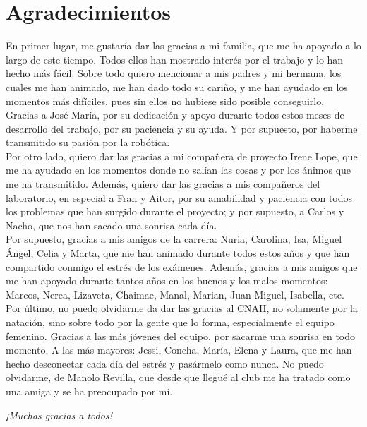 \chapter*{Agradecimientos}
En primer lugar, me gustaría dar las gracias a mi familia, que me ha apoyado a lo largo de este tiempo. Todos ellos han mostrado interés por el trabajo y lo han hecho más fácil. Sobre todo quiero mencionar a mis padres y mi hermana, los cuales me han animado, me han dado todo su cariño, y me han ayudado en los momentos más difíciles, pues sin ellos no hubiese sido posible conseguirlo.\\

Gracias a José María, por su dedicación y apoyo durante todos estos meses de desarrollo del trabajo, por su paciencia y su ayuda. Y por supuesto, por haberme transmitido su pasión por la robótica.\\

Por otro lado, quiero  dar las gracias a mi compañera de proyecto Irene Lope, que me ha ayudado en los momentos donde no salían las cosas y por los ánimos que me ha transmitido. Además, quiero dar las gracias a mis compañeros del laboratorio, en especial a Fran y Aitor, por su amabilidad y paciencia con todos los problemas que han surgido durante el proyecto; y por supuesto, a Carlos y Nacho, que nos han sacado una sonrisa cada día.\\

Por supuesto, gracias a mis amigos de la carrera: Nuria, Carolina, Isa, Miguel Ángel, Celia y Marta, 	que me han animado durante todos estos años y que han compartido conmigo el estrés de los exámenes. Además, gracias a mis amigos que me han apoyado durante tantos años en los buenos y los malos momentos: Marcos, Nerea, Lizaveta, Chaimae, Manal, Marian, Juan Miguel, Isabella, etc.\\

Por último, no puedo olvidarme da dar las gracias al CNAH, no solamente por la natación, sino sobre todo por la gente que lo forma, especialmente el equipo femenino. Gracias a las más jóvenes del equipo, por sacarme una sonrisa en todo momento. A las más mayores: Jessi, Concha, María, Elena y Laura, que me han hecho desconectar cada día del estrés y pasármelo como nunca. No puedo olvidarme, de Manolo Revilla, que desde que llegué al club me ha tratado como una amiga y se ha preocupado por mí.

\begin{flushright}
	\emph{¡Muchas gracias a todos!}
\end{flushright}